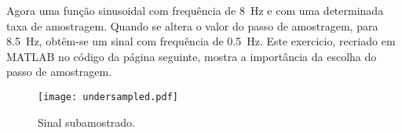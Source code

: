 Agora uma função sinusoidal com frequência de 8~Hz e com uma determinada taxa de amostragem. Quando se altera o valor do passo de amostragem, para 8.5~Hz, obtêm-se um sinal com frequência de 0.5~Hz. Este exercicio, recriado em MATLAB no código da página seguinte, mostra a importância da escolha do passo de amostragem.

\newpage



\begin{figure}[!ht]
\centering
\texttt{[image: undersampled.pdf]}
\caption{Sinal subamostrado.}
\label{fig:undersampled}
\end{figure}